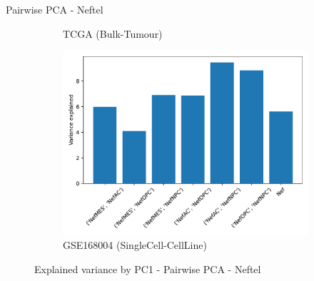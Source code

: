 \documentclass[aspectratio=169,9pt]{beamer}
\begin{document}
\begin{frame}{Pairwise PCA - Neftel}
\begin{adjustwidth}{-5cm}{-5cm}
\begin{figure}
\begin{subfigure}[c]{0.38\textwidth}
                    \caption{TCGA (Bulk-Tumour)}
                \end{subfigure}
                \begin{subfigure}[c]{0.38\textwidth}
                    \centering
                    \includegraphics[width=\textwidth]{mgg23_expvar_Nef}
                    \caption{GSE168004 (SingleCell-CellLine)}
                \end{subfigure}
                \caption{Explained variance by PC1 - Pairwise PCA - Neftel}
            \end{figure}
        \end{adjustwidth}
    \end{frame}
\end{document}
